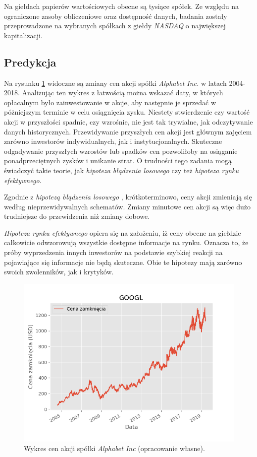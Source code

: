 \documentclass[a4paper, twoside, 11pt, openright]{article}
\begin{document}
\bigskip

Na giełdach papierów wartościowych obecne są tysiące spółek. Ze względu na ograniczone zasoby obliczeniowe oraz dostępność danych, badania zostały przeprowadzone na wybranych spółkach z giełdy \textit{NASDAQ} o największej kapitalizacji.

\subsection{Predykcja}

Na rysunku \ref{img:alphabet_history} widoczne są zmiany cen akcji spółki \textit{Alphabet Inc.} w latach 2004-2018. Analizując ten wykres z łatwością można wskazać daty, w których opłacalnym było zainwestowanie w akcje, aby następnie je sprzedać w póżniejszym terminie w celu osiągnięcia zysku. Niestety stwierdzenie czy wartość akcji w przyszłości spadnie, czy wzrośnie, nie jest tak trywialne, jak odczytywanie danych historycznych. Przewidywanie przyszłych cen akcji jest głównym zajęciem zarówno inwestorów indywidualnych, jak i instytucjonalnych. Skuteczne odgadywanie przyszłych wzrostów lub spadków cen pozwoliłoby na osiąganie ponadprzeciętnych zysków i unikanie strat. O trudności tego zadania mogą świadczyć takie teorie, jak \textit{hipoteza błądzenia losowego} czy też \textit{hipoteza rynku efektywnego}.

 Zgodnie z \textit{hipotezą błądzenia losowego} \cite{randwalk}, krótkoterminowo, ceny akcji zmieniają się według nieprzewidywalnych schematów. Zmiany minutowe cen akcji są więc dużo trudniejsze do przewidzenia niż zmiany dobowe. 
 
 \textit{Hipoteza rynku efektywnego} \cite{efficientmarket} opiera się na założeniu, iż ceny obecne na giełdzie całkowicie odwzorowują wszystkie dostępne informacje na rynku. Oznacza to, że próby wyprzedzenia innych inwestorów na podstawie szybkiej reakcji na pojawiające się informacje nie będą skuteczne. Obie te hipotezy mają zarówno swoich zwolenników, jak i krytyków.

\begin{figure}[H]
\centering \includegraphics[scale=0.9]{img/GOOGL_adj_close.png}
\caption{Wykres cen akcji spółki \textit{Alphabet Inc} (opracowanie własne).}
\label{img:alphabet_history}
\end{figure}
\end{document}
